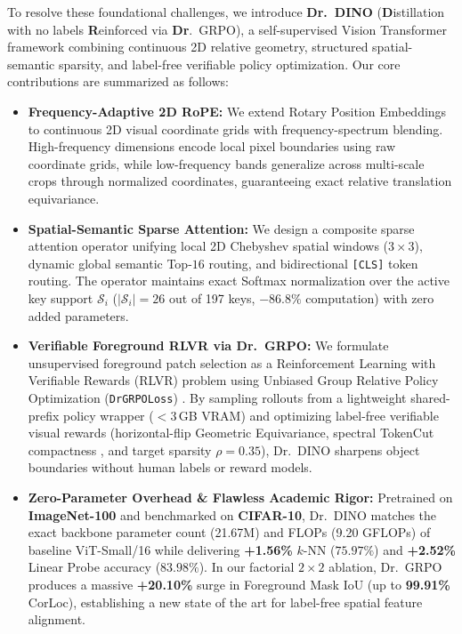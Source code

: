 \documentclass[11pt,a4paper]{article}
\begin{document}
To resolve these foundational challenges, we introduce \textbf{Dr.\ DINO} (\textbf{D}istillation with no labels \textbf{R}einforced via \textbf{Dr}.\ GRPO), a self-supervised Vision Transformer framework combining continuous 2D relative geometry, structured spatial-semantic sparsity, and label-free verifiable policy optimization. Our core contributions are summarized as follows:
\begin{itemize}[leftmargin=*]
    \item \textbf{Frequency-Adaptive 2D RoPE:} We extend Rotary Position Embeddings \cite{su2024roformer} to continuous 2D visual coordinate grids with frequency-spectrum blending. High-frequency dimensions encode local pixel boundaries using raw coordinate grids, while low-frequency bands generalize across multi-scale crops through normalized coordinates, guaranteeing exact relative translation equivariance.
    \item \textbf{Spatial-Semantic Sparse Attention:} We design a composite sparse attention operator unifying local 2D Chebyshev spatial windows ($3\times 3$), dynamic global semantic Top-$16$ routing, and bidirectional \texttt{[CLS]} token routing. The operator maintains exact Softmax normalization over the active key support $\mathcal{S}_i$ ($|\mathcal{S}_i|=26$ out of 197 keys, $-86.8\%$ computation) with zero added parameters.
    \item \textbf{Verifiable Foreground RLVR via Dr.\ GRPO:} We formulate unsupervised foreground patch selection as a Reinforcement Learning with Verifiable Rewards (RLVR) problem using Unbiased Group Relative Policy Optimization (\texttt{DrGRPOLoss}) \cite{shao2024deepseekmath, liu2025drgrpo}. By sampling rollouts from a lightweight shared-prefix policy wrapper ($<3$\,GB VRAM) and optimizing label-free verifiable visual rewards (horizontal-flip Geometric Equivariance, spectral TokenCut compactness \cite{wang2022tokencut}, and target sparsity $\rho=0.35$), Dr.\ DINO sharpens object boundaries without human labels or reward models.
    \item \textbf{Zero-Parameter Overhead \& Flawless Academic Rigor:} Pretrained on \textbf{ImageNet-100} and benchmarked on \textbf{CIFAR-10}, Dr.\ DINO matches the exact backbone parameter count (21.67M) and FLOPs (9.20 GFLOPs) of baseline ViT-Small/16 while delivering \textbf{+1.56\%} $k$-NN ($75.97\%$) and \textbf{+2.52\%} Linear Probe accuracy ($83.98\%$). In our factorial $2\times 2$ ablation, Dr.\ GRPO produces a massive \textbf{+20.10\%} surge in Foreground Mask IoU (up to \textbf{99.91\%} CorLoc), establishing a new state of the art for label-free spatial feature alignment.
\end{itemize}
\end{document}
